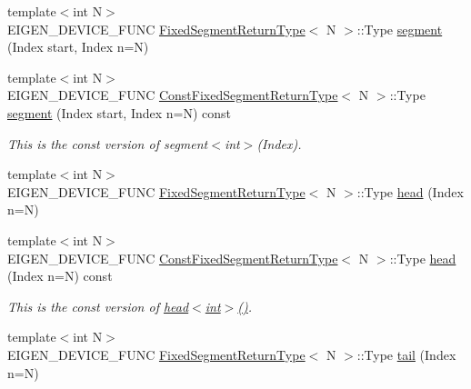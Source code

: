 \begin{DoxyCompactItemize}
{\footnotesize template$<$int N$>$ }\\E\+I\+G\+E\+N\+\_\+\+D\+E\+V\+I\+C\+E\+\_\+\+F\+U\+NC \mbox{\hyperlink{struct_eigen_1_1_dense_base_1_1_fixed_segment_return_type}{Fixed\+Segment\+Return\+Type}}$<$ N $>$\+::Type \mbox{\hyperlink{class_eigen_1_1_dense_base_a04ad846b3fa133e9047845ffe18ab58c}{segment}} (Index start, Index n=N)
\item 
\mbox{\label{class_eigen_1_1_dense_base_aed22dfed3dee22dfddf4697752d12ea0}} 
{\footnotesize template$<$int N$>$ }\\E\+I\+G\+E\+N\+\_\+\+D\+E\+V\+I\+C\+E\+\_\+\+F\+U\+NC \mbox{\hyperlink{struct_eigen_1_1_dense_base_1_1_const_fixed_segment_return_type}{Const\+Fixed\+Segment\+Return\+Type}}$<$ N $>$\+::Type \mbox{\hyperlink{class_eigen_1_1_dense_base_aed22dfed3dee22dfddf4697752d12ea0}{segment}} (Index start, Index n=N) const
\begin{DoxyCompactList}\small\item\em This is the const version of segment$<$int$>$(\+Index). \end{DoxyCompactList}\item 
{\footnotesize template$<$int N$>$ }\\E\+I\+G\+E\+N\+\_\+\+D\+E\+V\+I\+C\+E\+\_\+\+F\+U\+NC \mbox{\hyperlink{struct_eigen_1_1_dense_base_1_1_fixed_segment_return_type}{Fixed\+Segment\+Return\+Type}}$<$ N $>$\+::Type \mbox{\hyperlink{class_eigen_1_1_dense_base_a1acca94af7eeb14807e9637420adcaf1}{head}} (Index n=N)
\item 
\mbox{\label{class_eigen_1_1_dense_base_a494c3d8bd552638f27e24f3988bfa128}} 
{\footnotesize template$<$int N$>$ }\\E\+I\+G\+E\+N\+\_\+\+D\+E\+V\+I\+C\+E\+\_\+\+F\+U\+NC \mbox{\hyperlink{struct_eigen_1_1_dense_base_1_1_const_fixed_segment_return_type}{Const\+Fixed\+Segment\+Return\+Type}}$<$ N $>$\+::Type \mbox{\hyperlink{class_eigen_1_1_dense_base_a494c3d8bd552638f27e24f3988bfa128}{head}} (Index n=N) const
\begin{DoxyCompactList}\small\item\em This is the const version of \mbox{\hyperlink{class_eigen_1_1_dense_base_ac05a64c0740a6935f9d5d2a3558737e9}{head$<$int$>$()}}. \end{DoxyCompactList}\item 
{\footnotesize template$<$int N$>$ }\\E\+I\+G\+E\+N\+\_\+\+D\+E\+V\+I\+C\+E\+\_\+\+F\+U\+NC \mbox{\hyperlink{struct_eigen_1_1_dense_base_1_1_fixed_segment_return_type}{Fixed\+Segment\+Return\+Type}}$<$ N $>$\+::Type \mbox{\hyperlink{class_eigen_1_1_dense_base_ae3094ce815b8a2a0c9dd5054a8eee9f8}{tail}} (Index n=N)

\end{DoxyCompactItemize}
